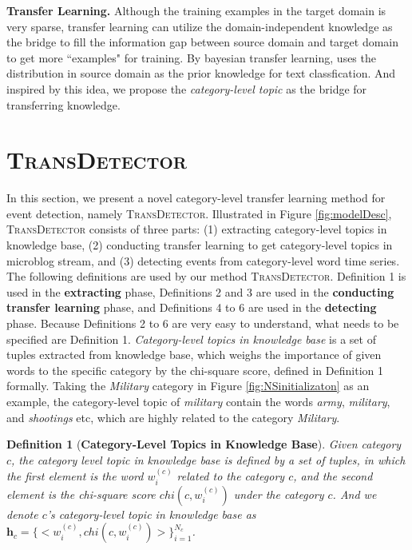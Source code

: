 \documentclass[runningheads,a4paper]{llncs}
\theoremstyle{exampstyle}
\newtheorem{rmkWithoutSpacing}[thm]{Definition}
\begin{document}
\textbf{Transfer Learning.} 
Although the training examples in the target domain is very sparse, transfer learning\cite{pan2010survey} can utilize the domain-independent knowledge as the bridge to fill the information gap between source domain and target domain\cite{Xiang2010Bridging} to get more ``examples" for training.
By bayesian transfer learning, \cite{dai2007transferring} uses the distribution in source domain as the prior knowledge for text classfication.
And inspired by this idea, we propose the \textit{category-level topic} as the bridge for transferring knowledge. 

\section{\textsc{TransDetector}} 
\label{sec:TransDetector}
In this section, we present a novel category-level transfer learning method for event detection, namely \textsc{TransDetector}. 
Illustrated in Figure \ref{fig:modelDesc}, \textsc{TransDetector} consists of three parts: (1) extracting category-level topics in knowledge base, (2) conducting transfer learning to get category-level topics in microblog stream, and (3) detecting events from category-level word time series.
The following definitions are used by our method \textsc{TransDetector}. 
Definition 1 is used in the \textbf{extracting} phase, Definitions 2 and 3 are used in the \textbf{conducting transfer learning} phase, and Definitions 4 to 6 are used in the \textbf{detecting} phase.
Because Definitions 2 to 6 are very easy to understand, what needs to be specified are Definition 1.
\textit{Category-level topics in knowledge base} is a set of tuples extracted from knowledge base, which weighs the importance of given words to the specific category by the chi-square score, defined in Definition 1 formally. 
Taking the \textit{Military} category in Figure \ref{fig:NSinitializaton} as an example, the category-level topic of \textit{military} contain the words \textit{army}, \textit{military}, and \textit{shootings} etc, which are highly related to the category \textit{Military}.

\begin{rmkWithoutSpacing}[\textbf{Category-Level Topics in Knowledge Base}] 
Given category \(c\), the category level topic in knowledge base is defined by a set of tuples, in which the first element is the word \(w^{(c)}_i\) related to the category \(c\), and the second element is the chi-square score \(chi(c,w^{(c)}_{i})\) under the category \(c\). 
And we denote \(c\)'s category-level topic in knowledge base as \(\bm{h}_c=\{<w^{(c)}_i,chi(c,w^{(c)}_{i})>\}_{i=1}^{N_c}\).
\end{rmkWithoutSpacing}
\end{document}
